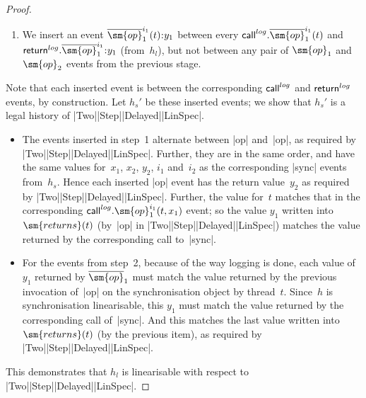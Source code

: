\begin{proof}
\begin{enumerate}
\item We insert an event $\overline{\sm{op}}_1^{i_1}(t) \:: y_1$ between every
  $\call^{log}.\overline{\sm{op}}_1^{i_1}(t)$ and
  $\return^{log}.\overline{\sm{op}}_1^{i_1} \:: y_1$ (from~$h_l$), but not
  between any pair of $\sm{op}_1$ and $\sm{op}_2$ events from the previous
  stage.  
\end{enumerate}
%
Note that each inserted event is between the corresponding $\mathsf{call}^{log}$ and
$\mathsf{return}^{log}$ events, by construction.  Let $h_s'$ be these inserted events;
we show that $h_s'$ is a legal history of |Two|\-|Step|\-|Delayed|\-|LinSpec|.
\begin{itemize}
\item The events inserted in step~1 alternate between |op| and~|op|, as
  required by |Two|\-|Step|\-|Delayed|\-|LinSpec|.  Further, they are in the
  same order, and have the same values for~$x_1$, $x_2$, $y_2$, $i_1$
  and~$i_2$ as the corresponding |sync| events from~$h_s$.  Hence each
  inserted |op| event has the return value~$y_2$ as required by
  |Two|\-|Step|\-|Delayed|\-|LinSpec|.  Further, the value for~$t$ matches
  that in the corresponding $\call^{log}.\sm{op}_1^{i_1}(t,x_1)$ event; so
  the value $y_1$ written into $\sm{returns}(t)$ (by~|op| in
  |Two|\-|Step|\-|Delayed|\-|LinSpec|) matches the value returned by the
  corresponding call to~|sync|.

\item For the events from step~2, because of the way logging is done, each
  value of~$y_1$ returned by $\overline{\sm{op}}_1$ must match the value
  returned by the previous invocation of~|op| on the synchronisation object
  by thread~$t$.  Since~$h$ is synchronisation linearisable, this $y_1$ must
  match the value returned by the corresponding call of~|sync|.  And this
  matches the last value written into $\sm{returns}(t)$ (by the previous
  item), as required by |Two|\-|Step|\-|Delayed|\-|LinSpec|.
\end{itemize}

%
This demonstrates that
$h_l$ is linearisable with respect to |Two|\-|Step|\-|Delayed|\-|LinSpec|.
\end{proof}


